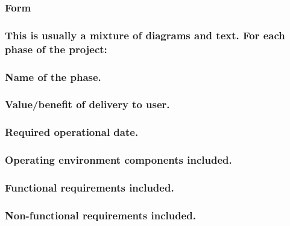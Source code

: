 \documentclass[
]{article}
\begin{document}
\hypertarget{form-34}{%
\subsubsection{Form}\label{form-34}}

\hypertarget{this-is-usually-a-mixture-of-diagrams-and-text.-for-each-phase-of-the-project}{%
\subsubsection{This is usually a mixture of diagrams and text. For each
phase of the
project:}\label{this-is-usually-a-mixture-of-diagrams-and-text.-for-each-phase-of-the-project}}

\hypertarget{name-of-the-phase.}{%
\subsubsection{Name of the phase.}\label{name-of-the-phase.}}

\hypertarget{valuebenefit-of-delivery-to-user.}{%
\subsubsection{Value/benefit of delivery to
user.}\label{valuebenefit-of-delivery-to-user.}}

\hypertarget{required-operational-date.}{%
\subsubsection{Required operational
date.}\label{required-operational-date.}}

\hypertarget{operating-environment-components-included.}{%
\subsubsection{Operating environment components
included.}\label{operating-environment-components-included.}}

\hypertarget{functional-requirements-included.}{%
\subsubsection{Functional requirements
included.}\label{functional-requirements-included.}}

\hypertarget{non-functional-requirements-included.}{%
\subsubsection{Non-functional requirements
included.}\label{non-functional-requirements-included.}}
\end{document}
